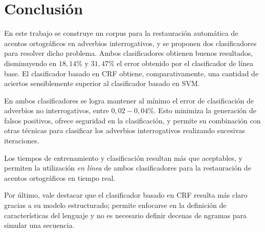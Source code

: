 \documentclass[runningheads,a4paper]{llncs}
\begin{document}
\section{Conclusión}
\label{sec:Conclusiones}

En este trabajo se construye un corpus para la restauración automática de acentos ortográficos en adverbios interrogativos, y se proponen dos clasificadores para resolver dicho problema. Ambos clasificadores obtienen buenos resultados, disminuyendo en $18,14\%$ y $31,47\%$ el error obtenido por el clasificador de línea base. El clasificador basado en CRF obtiene, comparativamente, una cantidad de aciertos sensiblemente superior al clasificador basado en SVM. 

En ambos clasificadores se logra mantener al m\'inimo el error de clasificaci\'on de adverbios no interrogativos, entre $0,02-0,04\%$. Esto minimiza la generaci\'on de falsos positivos, ofrece seguridad en la clasificaci\'on, y permite su combinaci\'on con otras t\'ecnicas para clasificar los adverbios interrogativos realizando sucesivas iteraciones.

Los tiempos de entrenamiento y clasificación resultan más que aceptables, y permiten la utilización \emph{en línea} de ambos clasificadores para la restauración de acentos ortogr\'aficos en tiempo real.

Por \'ultimo, vale destacar que el clasificador basado en CRF resulta m\'as claro gracias a su modelo estructurado; permite enfocarse en la definición de características del lenguaje y no es necesario definir decenas de ngramas para simular una secuencia.



\end{document}
